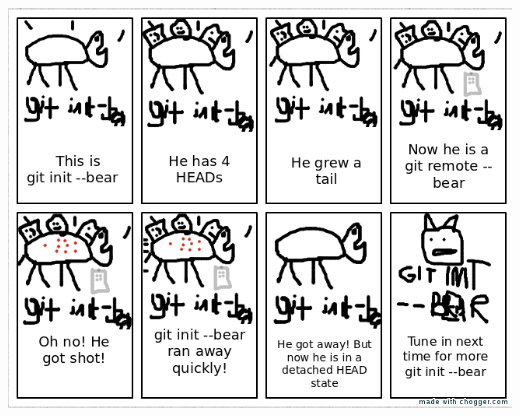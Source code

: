 \documentclass[9pt]{extarticle} %
\begin{document}
\begin{minipage}[t]{.66\linewidth}
\hypertarget{thirdnews}{} 

\begin{center}
\includegraphics[scale=0.40]{git_init_comic.png}
\end{center}

\end{minipage} %
\end{document}
